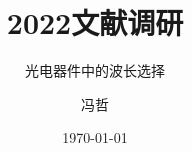 \usepackage{makeidx}
\makeindex

\usepackage{latexcolors}

\usepackage{tikz}

\usepackage{multicol}   %

\usepackage[space, hyperref, UTF8]{ctex}	%

\usepackage{amsmath,amssymb,amsthm}
\usepackage{esint}		%
\usepackage{amsfonts}
\usepackage{latexsym}
\usepackage{extarrows}  	%
\usepackage{physics}
\usepackage{upgreek}    	%
\usepackage{bm}     		%
\usepackage{slashed}    	%


\usepackage{graphicx}   %
\usepackage{float}      %
\usepackage{subfigure}  %





\title[文献调研]{2022文献调研}
\subtitle{光电器件中的波长选择}
\author{冯哲}
\date{\today}
